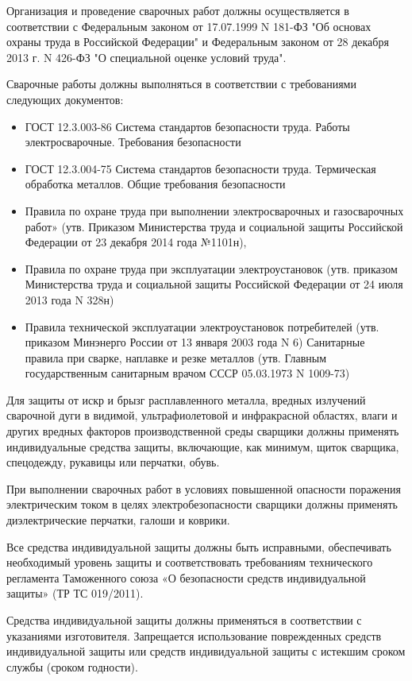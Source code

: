 \documentclass[russian,utf8,pointsection,nocolumnxxxi,nocolumnxxxii,12pt]{eskdtext}
\begin{document}
Организация и проведение сварочных работ должны осуществляется в соответствии с Федеральным законом от 17.07.1999 N 181-ФЗ "Об основах охраны труда в Российской Федерации" и Федеральным законом от 28 декабря 2013 г. N 426-ФЗ "О специальной оценке условий труда". \par
Сварочные работы должны выполняться в соответствии с требованиями следующих документов:
\begin{itemize}
\item ГОСТ 12.3.003-86 Система стандартов безопасности труда. Работы электросварочные. Требования безопасности
\item ГОСТ 12.3.004-75 Система стандартов безопасности труда. Термическая обработка металлов. Общие требования безопасности

\item Правила по охране труда при выполнении электросварочных и газосварочных работ» (утв. Приказом Министерства труда и социальной защиты Российской Федерации от 23 декабря 2014 года №1101н), 
\item Правила по охране труда при эксплуатации электроустановок (утв. приказом Министерства труда и социальной защиты Российской Федерации от 24 июля 2013 года N 328н) 
\item Правила технической эксплуатации электроустановок потребителей (утв. приказом Минэнерго России от 13 января 2003 года N 6)
Санитарные правила при сварке, наплавке и резке металлов (утв. Главным государственным санитарным врачом СССР 05.03.1973 N 1009-73)
\end{itemize}
\par
Для защиты от искр и брызг расплавленного металла, вредных излучений сварочной дуги в видимой, ультрафиолетовой и инфракрасной областях, влаги и других вредных факторов производственной среды сварщики должны применять индивидуальные средства защиты, включающие, как минимум, щиток сварщика, спецодежду, рукавицы или перчатки, обувь.
\par
При выполнении сварочных работ в условиях повышенной опасности поражения электрическим током в целях электробезопасности сварщики должны применять диэлектрические перчатки, галоши и коврики.
\par
Все средства индивидуальной защиты должны быть исправными, обеспечивать необходимый уровень защиты и соответствовать требованиям технического регламента Таможенного союза «О безопасности средств индивидуальной защиты» (ТР ТС 019/2011).
\par
Средства индивидуальной защиты должны применяться в соответствии с указаниями изготовителя.
Запрещается использование поврежденных средств индивидуальной защиты или средств индивидуальной защиты с истекшим сроком службы (сроком годности).
\end{document}
